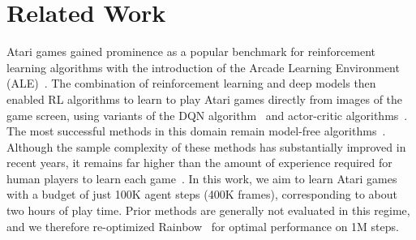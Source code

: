 \section{Related Work}
\label{sec:related_work}


Atari games gained prominence as a popular benchmark for reinforcement learning algorithms with the introduction of the Arcade Learning Environment (ALE)~\cite{ale}. The combination of reinforcement learning and deep models then enabled RL algorithms to learn to play Atari games directly from images of the game screen, using variants of the DQN algorithm~\cite{dqn, dqn2, rainbow} and actor-critic algorithms~\cite{a3c,ppo,ga3c,acktr,vtrace}. The most successful methods in this domain remain model-free algorithms~\cite{rainbow,vtrace}. Although the sample complexity of these methods has substantially improved in recent years, it remains far higher than the amount of experience required for human players to learn each game~\cite{human_atari_minutes}. In this work, we aim to learn Atari games with a budget of just 100K agent steps (400K frames), corresponding to about two hours of play time. Prior methods are generally not evaluated in this regime, and we therefore re-optimized Rainbow~\cite{rainbow} for optimal performance on 1M steps.



